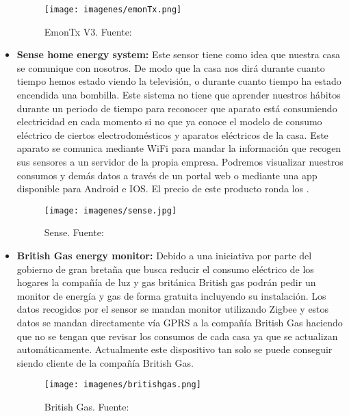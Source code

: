 \begin{itemize}
\begin{figure}[H]
	\centering
	\texttt{[image: imagenes/emonTx.png]}
	\caption[EmonTx V3.]{EmonTx V3. Fuente: \cite{emonTx}}
	\label{fig:emonTx}
\end{figure}

\item\textbf{Sense home energy system: } Este sensor tiene como idea que nuestra casa se comunique con nosotros. De modo que la casa nos dirá durante cuanto tiempo hemos estado viendo la televisión, o durante cuanto tiempo ha estado encendida una bombilla. Este sistema no tiene que aprender nuestros hábitos durante un periodo de tiempo para reconocer que aparato está consumiendo electricidad en cada momento si no que ya conoce el modelo de consumo eléctrico de ciertos electrodomésticos y aparatos eléctricos de la casa. Este aparato se comunica mediante WiFi para mandar la información que recogen sus sensores a un servidor de la propia empresa. Podremos visualizar nuestros consumos y demás datos a través de un portal web o mediante una app disponible para Android e IOS. El precio de este producto ronda los .\cite{Senseoficial}

\begin{figure}[H]
	\centering
	\texttt{[image: imagenes/sense.jpg]}
	\caption[Sense.]{Sense. Fuente: \cite{Senseimagen}}
	\label{fig:emonTx}
\end{figure}

\item\textbf{British Gas energy monitor: } Debido a una iniciativa por parte del gobierno de gran bretaña que busca reducir el consumo eléctrico de los hogares la compañía de luz y gas británica British gas podrán pedir un monitor de energía y gas de forma gratuita incluyendo su instalación. Los datos recogidos por el sensor se mandan monitor utilizando Zigbee y estos datos se mandan directamente vía GPRS a la compañía British Gas haciendo que no se tengan que revisar los consumos de cada casa ya que se actualizan automáticamente. Actualmente este dispositivo tan solo se puede conseguir siendo cliente de la compañía British Gas. \cite{BritishGas}

\begin{figure}[H]
	\centering
	\texttt{[image: imagenes/britishgas.png]}
	\caption[British Gas.]{British Gas. Fuente: \cite{BritishGas}}
	\label{fig:britishgas}
\end{figure}

	
\end{itemize}





